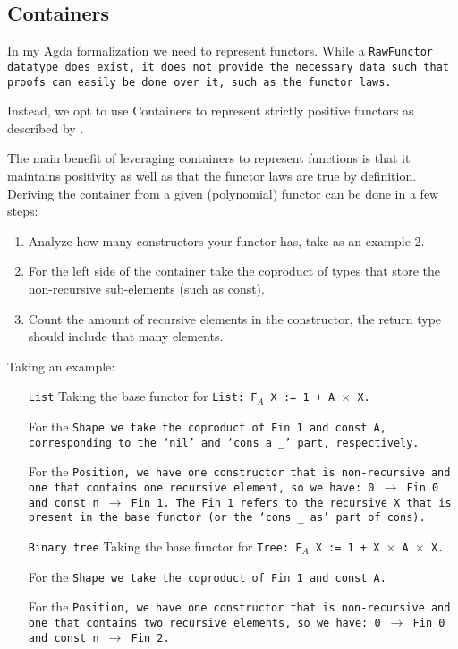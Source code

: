 
\subsection{Containers}
In my Agda formalization we need to represent functors.
While a \tt{RawFunctor} datatype does exist, it does not provide the necessary data such that proofs can easily be done over it, such as the functor laws.

Instead, we opt to use Containers to represent strictly positive functors as described by \cite{Abbott2005}.


The main benefit of leveraging containers to represent functions is that it maintains positivity as well as that the functor laws are true by definition.
Deriving the container from a given (polynomial) functor can be done in a few steps:
\begin{enumerate}
    \item Analyze how many constructors your functor has, take as an example 2.
    \item For the left side of the container take the coproduct of types that store the non-recursive sub-elements (such as const).
    \item Count the amount of recursive elements in the constructor, the return type should include that many elements.
\end{enumerate}
Taking an example:
\begin{itemize}
    \item[\tt{List}]
    Taking the base functor for \tt{List}: \tt{F$_A$ X := 1 + A $\times$ X}.

    For the \tt{Shape} we take the coproduct of \tt{Fin 1} and \tt{const A}, corresponding to the `\tt{nil}' and `\tt{cons a \_}' part, respectively.

    For the \tt{Position}, we have one constructor that is non-recursive and one that contains one recursive element, so we have:
    \tt{0 $\to$ Fin 0} and \tt{const n $\to$ Fin 1}.
    The Fin 1 refers to the recursive X that is present in the base functor (or the `\tt{cons \_ as}' part of cons).
    \item[\tt{Binary tree}]
    Taking the base functor for \tt{Tree}: \tt{F$_A$ X := 1 + X $\times$ A $\times$ X}.

    For the \tt{Shape} we take the coproduct of \tt{Fin 1} and \tt{const A}.

    For the \tt{Position}, we have one constructor that is non-recursive and one that contains two recursive elements, so we have:
    \tt{0 $\to$ Fin 0} and \tt{const n $\to$ Fin 2}.
\end{itemize}
